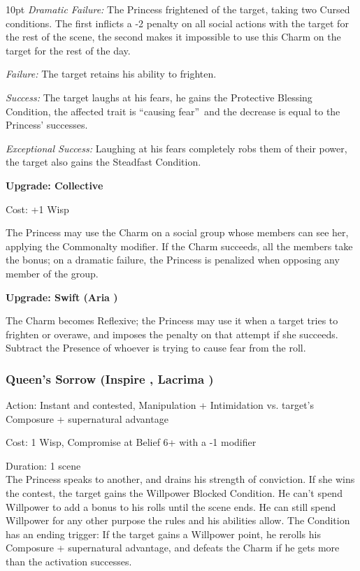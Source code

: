 \begin{myindentpar}{10pt}    \emph{Dramatic Failure:} The Princess frightened of the target, taking two Cursed conditions. The first inflicts a -2 penalty on all social actions with the target for the rest of the scene, the second makes it impossible to use this Charm on the target for the rest of the day. 

    \emph{Failure:} The target retains his ability to frighten.

    \emph{Success:} The target laughs at his fears, he gains the Protective Blessing Condition, the affected trait is \textquotedblleft causing fear\textquotedblright\, and the decrease is equal to the Princess' successes.

    \emph{Exceptional Success:} Laughing at his fears completely robs them of their power, the target also gains the Steadfast Condition. 

\textbf{Upgrade: Collective}

\noindent Cost: +1 Wisp

The Princess may use the Charm on a social group whose members can see her, applying the Commonalty modifier. If the Charm succeeds, all the members take the bonus; on a dramatic failure, the Princess is penalized when opposing any member of the group.

\textbf{Upgrade: Swift (Aria \textbullet\textbullet)}

The Charm becomes Reflexive; the Princess may use it when a target tries to frighten or overawe, and imposes the penalty on that attempt if she succeeds. Subtract the Presence of whoever is trying to cause fear from the roll.\end{myindentpar}


\subsubsection*{Queen's Sorrow (Inspire \textbullet\textbullet, Lacrima \textbullet\textbullet)}

\noindent Action: Instant and contested, Manipulation + Intimidation vs. target's Composure + supernatural advantage

\noindent Cost: 1 Wisp, Compromise at Belief 6+ with a -1 modifier

\noindent Duration: 1 scene \\ 

\noindent The Princess speaks to another, and drains his strength of conviction. If she wins the contest, the target gains the Willpower Blocked Condition. He can't spend Willpower to add a bonus to his rolls until the scene ends. He can still spend Willpower for any other purpose the rules and his abilities allow. The Condition has an ending trigger: If the target gains a Willpower point, he rerolls his Composure + supernatural advantage, and defeats the Charm if he gets more than the activation successes.


